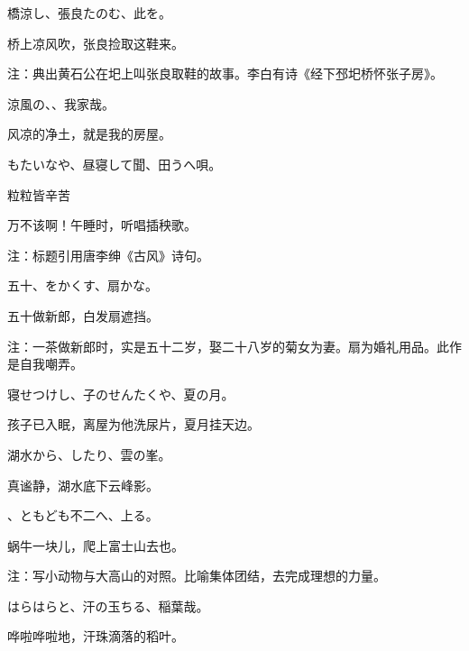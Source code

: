 \begin{haiku}
    {\FH 橋涼し、張良たのむ、此を。}

    {\FK 桥上凉风吹，张良捡取这鞋来。}

    {\FT 注：典出黄石公在圯上叫张良取鞋的故事。李白有诗《经下邳圯桥怀张子房》。}
\end{haiku}

\begin{haiku}
    {\FH 涼風の、、我家哉。}

    {\FK 风凉的净土，就是我的房屋。}
\end{haiku}

\begin{haiku}
    {\FH もたいなや、昼寝して聞、田うへ唄。}

    {\FK 粒粒皆辛苦}

    {\FK 万不该啊！午睡时，听唱插秧歌。}

    {\FT 注：标题引用唐李绅《古风》诗句。}
\end{haiku}

\begin{haiku}
    {\FH 五十、をかくす、扇かな。}

    {\FK 五十做新郎，白发扇遮挡。}

    {\FT 注：一茶做新郎时，实是五十二岁，娶二十八岁的菊女为妻。扇为婚礼用品。此作是自我嘲弄。}
\end{haiku}

\begin{haiku}
    {\FH 寝せつけし、子のせんたくや、夏の月。}

    {\FK 孩子已入眠，离屋为他洗尿片，夏月挂天边。}
\end{haiku}

\begin{haiku}
    {\FH 湖水から、したり、雲の峯。}

    {\FK 真谧静，湖水底下云峰影。}
\end{haiku}

\begin{haiku}
    {\FH {}、ともども不二へ、上る。}

    {\FK 蜗牛一块儿，爬上富士山去也。}

    {\FT 注：写小动物与大高山的对照。比喻集体团结，去完成理想的力量。}
\end{haiku}

\begin{haiku}
    {\FH はらはらと、汗の玉ちる、稲葉哉。}

    {\FK 哗啦哗啦地，汗珠滴落的稻叶。}
\end{haiku}

